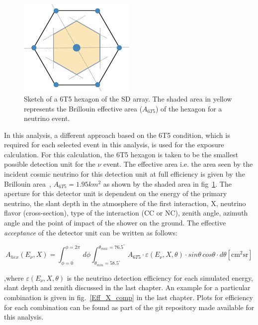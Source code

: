 \begin{figure}[t!]
  \centering
  \includegraphics[width=0.5\textwidth]{thesis_figures/ExpLimits/Brillouin_area.png}
  \caption{Sketch of a 6T5 hexagon of the SD array. The shaded area in yellow represents the Brillouin effective area ($A_{6T5}$) of the hexagon for a neutrino event.}
  \label{fig:Brillouin_area}
\end{figure}

In this analysis, a different approach based on the 6T5 condition, which is required for each selected event in this analysis, is used for the exposure calculation. For this calculation, the 6T5 hexagon is taken to be the smallest possible detection unit for the $\nu$ event. The effective area i.e. the area seen by the incident cosmic neutrino for this detection unit at full efficiency is given by the Brillouin area~\cite{PierreAuger:2010zof}, $A_{6T5} = 1.95km^2$ as shown by the shaded area in fig~\ref{fig:Brillouin_area}. The aperture for this detector unit is dependent on the energy of the primary neutrino, the slant depth in the atmosphere of the first interaction, X, neutrino flavor (cross-section), type of the interaction (CC or NC), zenith angle, azimuth angle and the point of impact of the shower on the ground. The effective \textit{acceptance} of the detector unit can be written as follows:

\begin{equation}
  \label{eq:nu_accep}
  A_{hex}(E_{\nu}, X)  = \int^{\phi = 2\pi}_{\phi = 0} \,d\phi \int_{\theta_{min} = 58.5^{\circ}}^{\theta_{max}= 76.5^{\circ}}  \, A_{6T5} \cdot \varepsilon(E_{\nu}, X, \theta) \cdot sin\theta \, cos\theta \cdot d\theta    \mathrm{[cm^2 sr]}
\end{equation}

,where $\varepsilon(E_{\nu}, X, \theta)$ is the neutrino detection efficiency for each simulated energy, slant depth and zenith discussed in the last chapter. An example for a particular combination is given in fig.~\ref{Eff_X_comp} in the last chapter. Plots for efficiency for each combination can be found as part of the git repository made available for this analysis.

